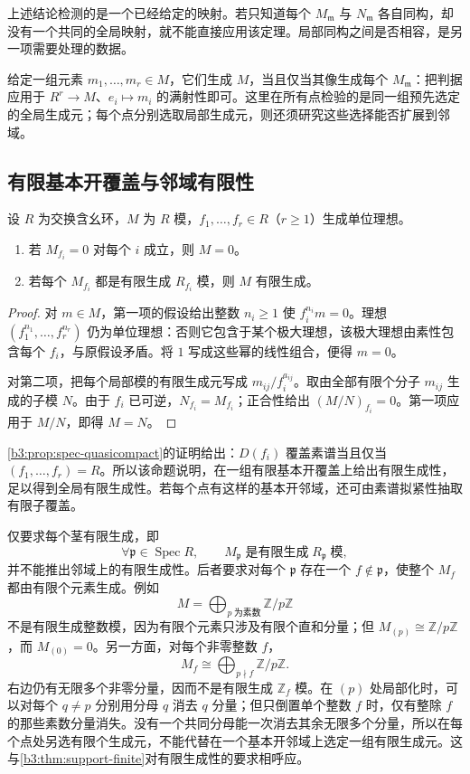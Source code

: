 上述结论检测的是一个已经给定的映射。若只知道每个 \(M_{\mathfrak m}\) 与 \(N_{\mathfrak m}\) 各自同构，却没有一个共同的全局映射，就不能直接应用该定理。局部同构之间是否相容，是另一项需要处理的数据。

\ProseParagraphBreak
给定一组元素 \(m_1,\ldots,m_r\in M\)，它们生成 \(M\)，当且仅当其像生成每个 \(M_{\mathfrak m}\)：把判据应用于 \(R^r\rightarrow M\)、\(e_i\mapsto m_i\) 的满射性即可。这里在所有点检验的是同一组预先选定的全局生成元；每个点分别选取局部生成元，则还须研究这些选择能否扩展到邻域。

\subsection{有限基本开覆盖与邻域有限性}
\label{b3:subsec:0204:03}

\begin{proposition}\label{b3:prop:principal-cover-finiteness}
	设 \(R\) 为交换含幺环，\(M\) 为 \(R\) 模，\(f_1,\ldots,f_r\in R\)（\(r\ge1\)）生成单位理想。
	\begin{enumerate}
		\item 若 \(M_{f_i}=0\) 对每个 \(i\) 成立，则 \(M=0\)。
		\item 若每个 \(M_{f_i}\) 都是有限生成 \(R_{f_i}\) 模，则 \(M\) 有限生成。
	\end{enumerate}
\end{proposition}
\begin{proof}
	对 \(m\in M\)，第一项的假设给出整数 \(n_i\ge1\) 使 \(f_i^{n_i}m=0\)。理想 \((f_1^{n_1},\ldots,f_r^{n_r})\) 仍为单位理想：否则它包含于某个极大理想，该极大理想由素性包含每个 \(f_i\)，与原假设矛盾。将 \(1\) 写成这些幂的线性组合，便得 \(m=0\)。

	对第二项，把每个局部模的有限生成元写成 \(m_{ij}/f_i^{a_{ij}}\)。取由全部有限个分子 \(m_{ij}\) 生成的子模 \(N\)。由于 \(f_i\) 已可逆，\(N_{f_i}=M_{f_i}\)；正合性给出 \((M/N)_{f_i}=0\)。第一项应用于 \(M/N\)，即得 \(M=N\)。
\end{proof}

\cref{b3:prop:spec-quasicompact}的证明给出：\(D(f_i)\) 覆盖素谱当且仅当 \((f_1,\ldots,f_r)=R\)。所以该命题说明，在一组有限基本开覆盖上给出有限生成性，足以得到全局有限生成性。若每个点有这样的基本开邻域，还可由素谱拟紧性抽取有限子覆盖。

\ProseParagraphBreak
仅要求每个茎有限生成，即
\[
	\forall\mathfrak p\in\operatorname{Spec}R,\qquad M_{\mathfrak p}\;\text{是有限生成}\;R_{\mathfrak p}\;\text{模},
\]
并不能推出邻域上的有限生成性。后者要求对每个 \(\mathfrak p\) 存在一个 \(f\notin\mathfrak p\)，使整个 \(M_f\) 都由有限个元素生成。例如
\[
	M=\bigoplus_{p\;\text{为素数}}\mathbb Z/p\mathbb Z
\]
不是有限生成整数模，因为有限个元素只涉及有限个直和分量；但 \(M_{(p)}\cong\mathbb Z/p\mathbb Z\)，而 \(M_{(0)}=0\)。另一方面，对每个非零整数 \(f\)，
\[
	M_f\cong\bigoplus_{p\nmid f}\mathbb Z/p\mathbb Z.
\]
右边仍有无限多个非零分量，因而不是有限生成 \(\mathbb Z_f\) 模。在 \((p)\) 处局部化时，可以对每个 \(q\ne p\) 分别用分母 \(q\) 消去 \(q\) 分量；但只倒置单个整数 \(f\) 时，仅有整除 \(f\) 的那些素数分量消失。没有一个共同分母能一次消去其余无限多个分量，所以在每个点处另选有限个生成元，不能代替在一个基本开邻域上选定一组有限生成元。这与\cref{b3:thm:support-finite}对有限生成性的要求相呼应。

